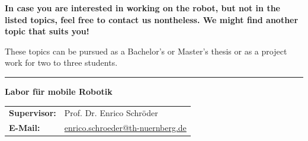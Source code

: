 \documentclass{ohm_project_description}
\begin{document}
\textbf{In case you are interested in working on the robot, but not in the listed topics, feel free to contact us nontheless. We might find another topic that suits you!}


\vspace{0.5cm}
These topics can be pursued as a Bachelor's or Master's thesis or as a project work for two to three students.


\vfill
\textcolor{ohm_red}{\rule{\linewidth}{0.4mm}}
\textbf{\textcolor{ohm_red}{Labor für mobile Robotik}} \\
\begin{tabular}{@{}ll}
\textbf{Supervisor:} & Prof. Dr. Enrico Schröder \\
\textbf{E-Mail:}   & \href{mailto:enrico.schroeder@th-nuernberg.de}{enrico.schroeder@th-nuernberg.de} \\
\end{tabular}
\end{document}
